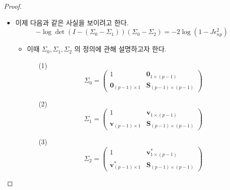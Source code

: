 \begin{proof}
\begin{itemize}
\begin{itemize}
    
    
    
\end{itemize}

    
\end{itemize}






\vspace{20mm}

\begin{itemize}
    
    \item 이제 다음과 같은 사실을 보이려고 한다.
    $$- \log \det ( I - (\Sigma_0 - \Sigma_1 ))  (\Sigma_0 - \Sigma_2) = - 2 \log (1 - J \epsilon_{np}^2) $$

\begin{itemize}
    
    \item 이때 $\Sigma_{0},\Sigma_{1},\Sigma_{2}$ 의 정의에 관해 설명하고자 한다.
    

   
   \begin{itemize}
    \item[(1)]
$$\Sigma_{0} =     
\begin{pmatrix} 
1 & \textbf{0}_{1\times(p-1)} \\
\textbf{0}_{(p-1)\times1} & \textbf{S}_{(p-1)\times(p-1)}
\end{pmatrix}$$

\vspace{5mm}

\item[(2)]
$$\Sigma_{1} =     
\begin{pmatrix} 
1 & \textbf{v}_{1\times(p-1)} \\
\textbf{v}_{(p-1)\times1} & \textbf{S}_{(p-1)\times(p-1)}
\end{pmatrix}$$

\vspace{5mm}

\item[(3)]
$$\Sigma_{2} =     
\begin{pmatrix} 
1 & {\textbf{v}}^*_{1\times(p-1)} \\
{\textbf{v}}^*_{(p-1)\times1} & \textbf{S}_{(p-1)\times(p-1)}
\end{pmatrix}$$



\end{itemize}
\end{itemize}
\end{itemize}
\end{proof}

